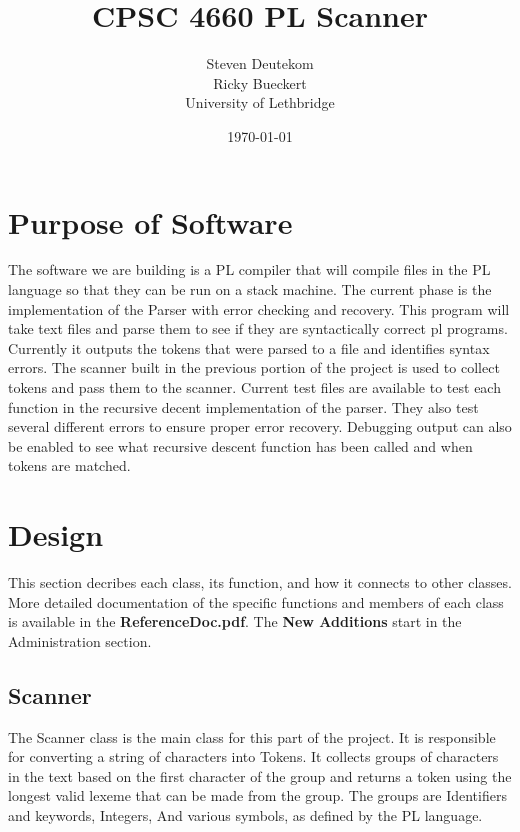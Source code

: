 \documentclass{article}
\begin{document}
\title{CPSC 4660 PL Scanner}
\author{Steven Deutekom\\
        Ricky Bueckert\\
        University of Lethbridge}
\date{\today}

\maketitle

\section{Purpose of Software}
The software we are building is a PL compiler that will compile files in the PL
language so that they can be run on a stack machine. The current phase is the
implementation of the Parser with error checking and recovery.
This program will take text files and parse them to see if they are syntactically correct
pl programs. Currently it outputs the tokens that were parsed to a file and identifies
syntax errors. The scanner built in the previous portion of the project is used to
collect tokens and pass them to the scanner. Current test files are available to
test each function in the recursive decent implementation of the parser. They also test
several different errors to ensure proper error recovery. Debugging output can also be
enabled to see what recursive descent function has been called and when tokens are matched.


\section{Design}
This section decribes each class, its function, and how it connects to other classes.
More detailed documentation of the specific functions and members of each class
is available in the \textbf{ReferenceDoc.pdf}. The \textbf{New Additions} start in the
Administration section.

\subsection{Scanner}
The Scanner class is the main class for this part of the project. It is responsible
for converting a string of characters into Tokens. It collects groups of characters
in the text based on the first character of the group and returns a token
using the longest valid lexeme that can be made from the group. The groups
are Identifiers and keywords, Integers, And various symbols, as defined by the
PL language.
\end{document}
